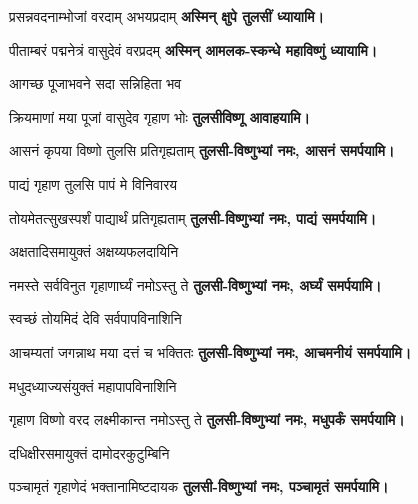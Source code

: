 \renewcommand{\devAya}{तुलसी-विष्णुभ्यां नमः,}
\begin{center}

{प्रसन्नवदनाम्भोजां वरदाम् अभयप्रदाम्}
\textbf{अस्मिन् क्षुपे तुलसीं ध्यायामि।}
\medskip

{पीताम्बरं पद्मनेत्रं वासुदेवं वरप्रदम्}
\textbf{अस्मिन् आमलक-स्कन्धे महाविष्णुं ध्यायामि।}
\medskip

{आगच्छ पूजाभवने सदा सन्निहिता भव}

{क्रियमाणां मया पूजां वासुदेव गृहाण भोः}
\textbf{तुलसीविष्णू आवाहयामि।}
\medskip

{आसनं कृपया विष्णो तुलसि प्रतिगृह्यताम्}
\textbf{\devAya{} आसनं समर्पयामि।}
\medskip

{पाद्यं गृहाण तुलसि पापं मे विनिवारय}

{तोयमेतत्सुखस्पर्शं पाद्यार्थं प्रतिगृह्यताम्}
\textbf{\devAya{} पाद्यं समर्पयामि।}
\medskip

{अक्षतादिसमायुक्तं अक्षय्यफलदायिनि}

{नमस्ते सर्वविनुत गृहाणार्घ्यं नमोऽस्तु ते}
\textbf{\devAya{} अर्घ्यं समर्पयामि।}
\medskip

\begin{minipage}{\linewidth}
\centering
{}
{स्वच्छं तोयमिदं देवि सर्वपापविनाशिनि}

{आचम्यतां जगन्नाथ मया दत्तं च भक्तितः}
\textbf{\devAya{} आचमनीयं समर्पयामि।}
\medskip
\end{minipage}

{मधुदध्याज्यसंयुक्तं महापापविनाशिनि}

{गृहाण विष्णो वरद लक्ष्मीकान्त नमोऽस्तु ते}
\textbf{\devAya{} मधुपर्कं समर्पयामि।}
\medskip

{दधिक्षीरसमायुक्तं दामोदरकुटुम्बिनि}

{पञ्चामृतं गृहाणेदं भक्तानामिष्टदायक}
\textbf{\devAya{} पञ्चामृतं समर्पयामि।}
\medskip


\end{center}
